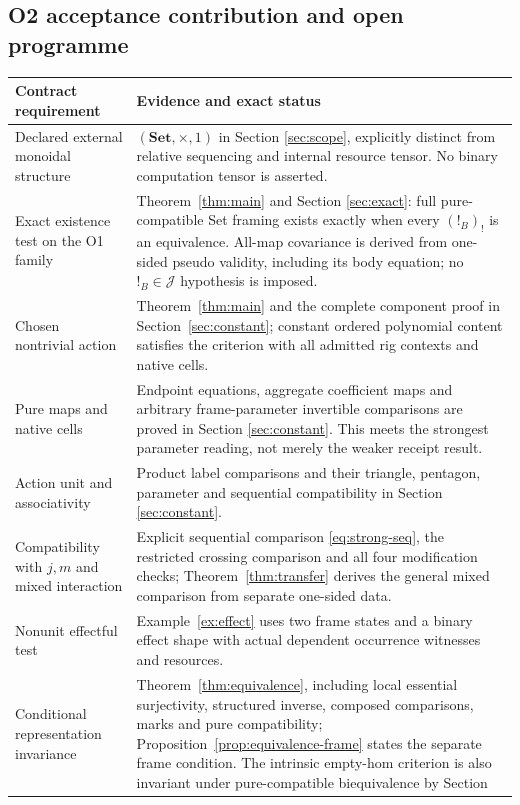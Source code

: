 \documentclass[11pt,a4paper]{article}
\theoremstyle{definition}
\newcommand{\Set}{\mathbf{Set}}
\newcommand{\J}{\mathcal J}
\begin{document}
\subsection{O2 acceptance contribution and open programme}
\begin{longtable}{@{}p{.29\linewidth}p{.65\linewidth}@{}}
\toprule
Contract requirement&Evidence and exact status\\
\midrule\endhead
Declared external monoidal structure&$(\Set,\times,1)$ in Section
\ref{sec:scope}, explicitly distinct from relative sequencing and internal
resource tensor. No binary computation tensor is asserted.\\
Exact existence test on the O1 family&Theorem~\ref{thm:main} and Section
\ref{sec:exact}: full pure-compatible Set framing exists exactly when
every $(!_B)_!$ is an equivalence. All-map covariance is derived from
one-sided pseudo validity, including its body equation; no
$!_B\in\J$ hypothesis is imposed.\\
Chosen nontrivial action&Theorem~\ref{thm:main} and the complete component
proof in Section~\ref{sec:constant}; constant ordered polynomial content
satisfies the criterion with all admitted rig contexts and native cells.\\
Pure maps and native cells&Endpoint equations, aggregate coefficient maps
and arbitrary frame-parameter invertible comparisons are proved in Section
\ref{sec:constant}. This meets the strongest parameter reading, not merely
the weaker receipt result.\\
Action unit and associativity&Product label comparisons and their triangle,
pentagon, parameter and sequential compatibility in Section
\ref{sec:constant}.\\
Compatibility with $j,m$ and mixed interaction&Explicit sequential comparison
\eqref{eq:strong-seq}, the restricted crossing comparison and all four
modification checks; Theorem~\ref{thm:transfer} derives the general mixed
comparison from separate one-sided data.\\
Nonunit effectful test&Example~\ref{ex:effect} uses two frame states and a
binary effect shape with actual dependent occurrence witnesses and resources.\\
Conditional representation invariance&Theorem~\ref{thm:equivalence}, including
local essential surjectivity, structured inverse, composed comparisons,
marks and pure compatibility; Proposition~\ref{prop:equivalence-frame}
states the separate frame condition. The intrinsic empty-hom criterion is
also invariant under pure-compatible biequivalence by Section

\end{longtable}
\end{document}
